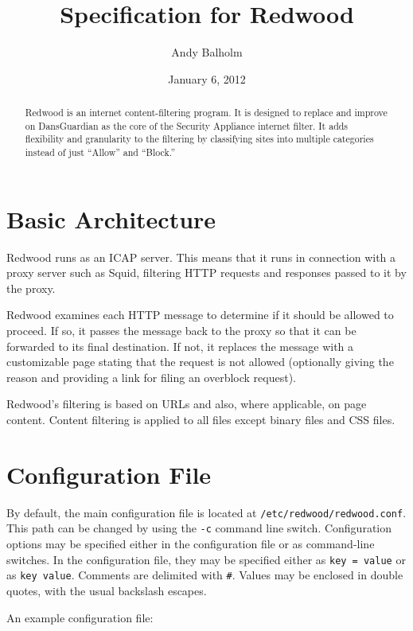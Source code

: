 \documentclass{article}
\title{Specification for Redwood}
\author{Andy Balholm}
\date{January 6, 2012}
\begin{document}
\maketitle

\begin{abstract}

Redwood is an internet content-filtering program. 
It is designed to replace and improve on DansGuardian 
as the core of the Security Appliance internet filter. 
It adds flexibility and granularity to the filtering by classifying sites 
into multiple categories instead of just ``Allow'' and ``Block.'' 

\end{abstract}

\section{Basic Architecture}

Redwood runs as an ICAP server. This means that it runs in connection 
with a proxy server such as Squid, filtering HTTP requests and responses 
passed to it by the proxy.

Redwood examines each HTTP message to determine if it should be allowed to proceed. 
If so, it passes the message back to the proxy so that it can be forwarded 
to its final destination. If not, it replaces the message with a customizable page 
stating that the request is not allowed (optionally giving the reason 
and providing a link for filing an overblock request).

Redwood's filtering is based on URLs and also, where applicable, on page content. 
Content filtering is applied to all files except binary files and CSS files.

\section{Configuration File}

By default, the main configuration file is located at \verb"/etc/redwood/redwood.conf". 
This path can be changed by using the \verb"-c" command line switch. 
Configuration options may be specified either in the configuration file or as command-line
switches. In the configuration file, they may be specified either as
\verb"key = value" or as \verb"key value". Comments are delimited with \verb"#". 
Values may be enclosed in double quotes, with the usual backslash escapes.

An example configuration file:
\end{document}
